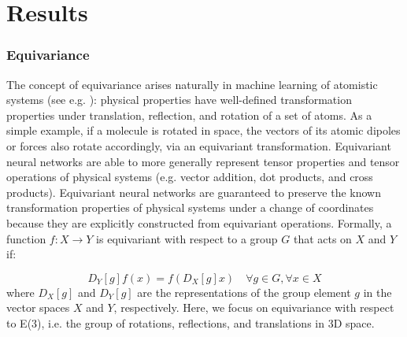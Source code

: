 \documentclass[11pt]{article}
\begin{document}
\section{Results}

\subsubsection{Equivariance}
The concept of equivariance arises naturally in machine learning of atomistic systems (see e.g. \cite{grisafi2019atomic}): physical properties have well-defined transformation properties under translation, reflection, and rotation of a set of atoms. As a simple example, if a molecule is rotated in space, the vectors of its atomic dipoles or forces also rotate accordingly, via an equivariant transformation. Equivariant neural networks are able to more generally represent tensor properties and tensor operations of physical systems (e.g. vector addition, dot products, and cross products). Equivariant neural networks are guaranteed to preserve the known transformation properties of physical systems under a change of coordinates because they are explicitly constructed from equivariant operations. Formally, a function $f: X \rightarrow Y$ is equivariant with respect to a group $G$ that acts on $X$ and $Y$ if: 

\begin{equation}
    D_Y[g] f(x) = f (D_X[g] x) \quad \forall g \in G, \forall x \in X
\end{equation}
where $D_X[g]$ and $D_Y[g]$ are the representations of the group element $g$ in the vector spaces $X$ and $Y$, respectively. Here, we focus on equivariance with respect to E(3), i.e. the group of rotations, reflections, and translations in 3D space.
\end{document}
